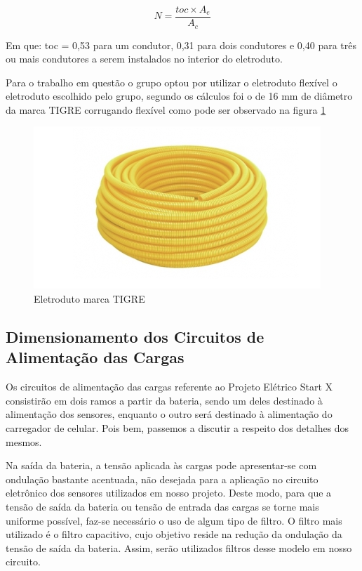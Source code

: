 \begin{equation}
	N = \frac{toc \times A_e}{A_c}
\end{equation}

Em que: toc = 0,53 para um condutor, 0,31 para dois condutores e 0,40 para três ou mais condutores a serem instalados no interior do eletroduto.

Para o trabalho em questão o grupo optou por utilizar o eletroduto flexível o eletroduto escolhido pelo grupo, segundo os cálculos foi o de 16 mm de diâmetro da marca TIGRE corrugando flexível como pode ser observado na figura \ref{eletroduto-tigre}

\begin{figure}[h]
	\centering
	\includegraphics[scale=0.6]		{figuras/eletroduto.png}
	\caption{Eletroduto marca TIGRE}
	\label{eletroduto-tigre}
\end{figure}

\subsection{Dimensionamento dos Circuitos de Alimentação das Cargas}

Os circuitos de alimentação das cargas referente ao Projeto Elétrico Start X consistirão em dois ramos a partir da bateria, sendo um deles destinado à alimentação dos sensores, enquanto o outro será destinado à alimentação do carregador de celular. Pois bem, passemos a discutir a respeito dos detalhes dos mesmos.

Na saída da bateria, a tensão aplicada às cargas pode apresentar-se com ondulação bastante acentuada, não desejada para a aplicação no circuito eletrônico dos sensores utilizados em nosso projeto. Deste modo, para que a tensão de saída da bateria ou tensão de entrada das cargas se torne mais uniforme possível, faz-se necessário o uso de algum tipo de filtro. O filtro mais utilizado é o filtro capacitivo, cujo objetivo reside na redução da ondulação da tensão de saída da bateria. Assim, serão utilizados filtros desse modelo em nosso circuito.

